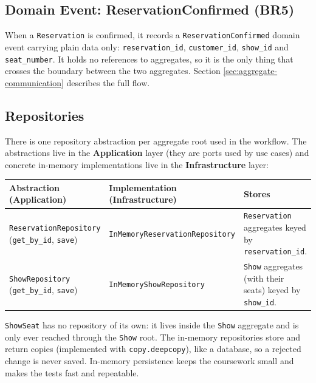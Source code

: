 \documentclass[11pt,a4paper]{article}
\newcommand{\code}[1]{\texttt{#1}}
\begin{document}
\subsection{Domain Event: ReservationConfirmed (BR5)}

When a \code{Reservation} is confirmed, it records a \code{ReservationConfirmed}
domain event carrying plain data only: \code{reservation\_id},
\code{customer\_id}, \code{show\_id} and \code{seat\_number}. It holds no
references to aggregates, so it is the only thing that crosses the boundary
between the two aggregates. Section \ref{sec:aggregate-communication} describes
the full flow.

\subsection{Repositories}

There is one repository abstraction per aggregate root used in the workflow.
The abstractions live in the \textbf{Application} layer (they are ports used by
use cases) and concrete in-memory implementations live in the
\textbf{Infrastructure} layer:

\begin{center}
  \begin{tabularx}{\textwidth}{@{}l l X@{}}
    \toprule
    \textbf{Abstraction (Application)} & \textbf{Implementation (Infrastructure)} & \textbf{Stores} \\
    \midrule
    \code{ReservationRepository}
      (\code{get\_by\_id}, \code{save}) &
    \code{InMemoryReservationRepository} &
    \code{Reservation} aggregates keyed by \code{reservation\_id}. \\
    \code{ShowRepository}
      (\code{get\_by\_id}, \code{save}) &
    \code{InMemoryShowRepository} &
    \code{Show} aggregates (with their seats) keyed by \code{show\_id}. \\
    \bottomrule
  \end{tabularx}
\end{center}

\code{ShowSeat} has no repository of its own: it lives inside the \code{Show}
aggregate and is only ever reached through the \code{Show} root. The in-memory
repositories store and return copies (implemented with \code{copy.deepcopy}),
like a database, so a rejected change is never saved. In-memory persistence
keeps the coursework small and makes the tests fast and repeatable.

\end{document}
